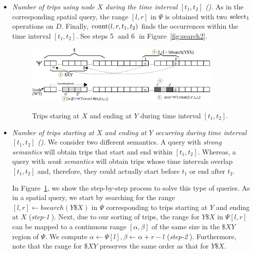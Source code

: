 \begin{itemize}[leftmargin=3mm]
		\item {\em Number of trips using node $X$ during the time interval $[t_1,t_2]$ (\Tux).}
		As in the corresponding spatial query, the range $[l,r]$ in $\Psi$  is obtained with two $\operatorname{select}_1$ operations on $D$.
		Finally, $\operatorname{count}(l,r,t_1,t_2)$ finds the occurrences within the time interval $[t_1,t_2]$.
		See steps \textcircled{5} and \textcircled{6}  in Figure~\ref{fig:search2}.



	\begin{figure}[thb]
		\begin{center}
			{\includegraphics[width=0.90\textwidth]{figures/search.eps}}
		\end{center}
		\vspace{-0.3cm}
		\caption{Trips staring at $X$ and ending at $Y$ during time interval $[t_1,t_2]$.}
		\label{fig:search}
	\end{figure}	
		\item {\em Number of trips starting at $X$ and ending at $Y$ occurring during  time interval $[t_1,t_2]$ (\Tfxty).}
		We consider two different semantics. A query with  {\em strong semantics} will obtain trips
		that start and end within  $[t_1,t_2]$. Whereas, a query with  {\em weak semantics} will obtain trips
		whose time intervals overlap  $[t_1,t_2]$ and, therefore, they could actually start before $t_1$ or end after $t_2$.
		
		In Figure~\ref{fig:search}, we show the step-by-step process to solve this type of queries.
		As in a spatial query, we start by searching for the range $[l,r] \leftarrow bsearch(Y\$X)$ in $\Psi$ corresponding 
		to trips starting at $Y$ and ending at $X$ ({\em step-\textcircled{1}}). Next, due to our sorting of trips,  the range for $Y\$X$ in $\Psi[l,r]$
		can be mapped to a continuous range $[\alpha,\beta]$ of the same size in the $\$XY$ region of $\Psi$. We compute $\alpha \leftarrow \Psi[l], 
		\beta\leftarrow\alpha+r-l$ ({\em step-\textcircled{2}}). Furthermore, note that the range for $\$XY$ preserves the same order as that for $Y\$X$.
		

\end{itemize}
